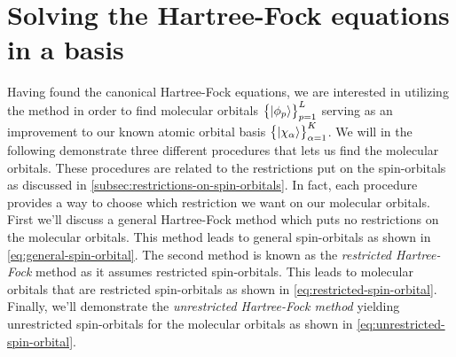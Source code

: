     \section{Solving the Hartree-Fock equations in a basis}
        Having found the canonical Hartree-Fock equations, we are interested
        in utilizing the method in order to find molecular orbitals
        $\left\{ | \phi_p \rangle \right\}_{p = 1}^{L}$ serving as an improvement to our
        known atomic orbital basis $\left\{ | \chi_{\alpha} \rangle \right\}_{\alpha =
        1}^{K}$.
        We will in the following demonstrate three different procedures that
        lets us find the molecular orbitals.
        These procedures are related to the restrictions put on the
        spin-orbitals as discussed in
        \autoref{subsec:restrictions-on-spin-orbitals}.
        In fact, each procedure provides a way to choose which restriction we
        want on our molecular orbitals.
        First we'll discuss a general Hartree-Fock method which puts no
        restrictions on the molecular orbitals.
        This method leads to general spin-orbitals as shown in
        \autoref{eq:general-spin-orbital}.
        The second method is known as the \emph{restricted Hartree-Fock} method
        as it assumes restricted spin-orbitals.
        This leads to molecular orbitals that are restricted spin-orbitals as
        shown in \autoref{eq:restricted-spin-orbital}.
        Finally, we'll demonstrate the \emph{unrestricted Hartree-Fock method}
        yielding unrestricted spin-orbitals for the molecular orbitals as
        shown in \autoref{eq:unrestricted-spin-orbital}.

